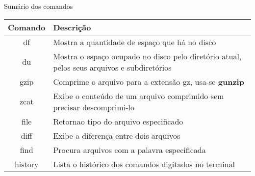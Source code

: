 \documentclass{beamer}
\begin{document}
\begin{frame}{Sumário dos comandos}
\begin{center}
 \begin{tabular}{|| c | p{7cm}||} 
 \hline
 \textbf{Comando} & \textbf{Descri\c{c}ão}\\ [0.5ex] 
 \hline\hline
 df & Mostra a quantidade de espa\c{c}o que há no disco\\
 \hline
 du & Mostra o espa\c{c}o ocupado no disco pelo diretório atual, pelos seus arquivos e subdiretórios\\
 \hline
 gzip & Comprime o arquivo para a extensão gz, usa-se \textbf{gunzip}\\
 \hline
 zcat & Exibe o conteúdo de um arquivo comprimido sem precisar descomprimi-lo\\
 \hline
 file & Retornao tipo do arquivo especificado\\
 \hline
 diff & Exibe a diferen\c{c}a entre dois arquivos\\
 \hline
 find & Procura arquivos com a palavra especificada\\
 \hline
 history & Lista o histórico dos comandos digitados no terminal\\
 \hline
\end{tabular}
\end{center}
\end{frame}
\end{document}
